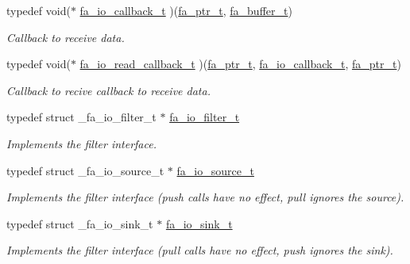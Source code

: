 \begin{DoxyCompactItemize}
\item 
typedef void($\ast$ \hyperlink{group___fa_io_gaa151f2c484756349795513fdf67a0268}{fa\-\_\-io\-\_\-callback\-\_\-t} )(\hyperlink{group___fa_ga915ddeae99ad7568b273d2b876425197}{fa\-\_\-ptr\-\_\-t}, \hyperlink{group___fa_buffer_ga0ed7a1d783ab322e2e8be02432d0839e}{fa\-\_\-buffer\-\_\-t})
\begin{DoxyCompactList}\small\item\em Callback to receive data. \end{DoxyCompactList}\item 
typedef void($\ast$ \hyperlink{group___fa_io_gabadf768f91c382d0700638f384f48416}{fa\-\_\-io\-\_\-read\-\_\-callback\-\_\-t} )(\hyperlink{group___fa_ga915ddeae99ad7568b273d2b876425197}{fa\-\_\-ptr\-\_\-t}, \hyperlink{group___fa_io_gaa151f2c484756349795513fdf67a0268}{fa\-\_\-io\-\_\-callback\-\_\-t}, \hyperlink{group___fa_ga915ddeae99ad7568b273d2b876425197}{fa\-\_\-ptr\-\_\-t})
\begin{DoxyCompactList}\small\item\em Callback to recive callback to receive data. \end{DoxyCompactList}\item 
typedef struct \-\_\-fa\-\_\-io\-\_\-filter\-\_\-t $\ast$ \hyperlink{group___fa_io_ga3e1f11810efcba3b45842e10c1425aba}{fa\-\_\-io\-\_\-filter\-\_\-t}
\begin{DoxyCompactList}\small\item\em Implements the filter interface. \end{DoxyCompactList}\item 
typedef struct \-\_\-fa\-\_\-io\-\_\-source\-\_\-t $\ast$ \hyperlink{group___fa_io_ga95a53a87c83414434e1afd3097b96ea4}{fa\-\_\-io\-\_\-source\-\_\-t}
\begin{DoxyCompactList}\small\item\em Implements the filter interface (push calls have no effect, pull ignores the source). \end{DoxyCompactList}\item 
typedef struct \-\_\-fa\-\_\-io\-\_\-sink\-\_\-t $\ast$ \hyperlink{group___fa_io_ga0d00d1e2c742abdba97597662815ce3a}{fa\-\_\-io\-\_\-sink\-\_\-t}
\begin{DoxyCompactList}\small\item\em Implements the filter interface (pull calls have no effect, push ignores the sink). \end{DoxyCompactList}\end{DoxyCompactItemize}

